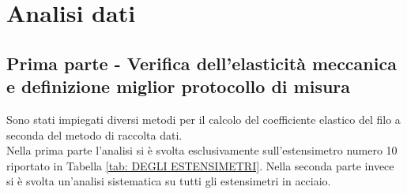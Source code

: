 \documentclass[a4paper,11pt,oneside]{article}
\begin{document}
\section{Analisi dati}

\subsection{Prima parte - Verifica dell'elasticità meccanica e definizione miglior protocollo di misura}
Sono stati impiegati diversi metodi per il calcolo del coefficiente elastico del filo a seconda del metodo di raccolta dati.\\
Nella prima parte l'analisi si è svolta esclusivamente sull'estensimetro numero 10 riportato in Tabella \ref{tab: DEGLI ESTENSIMETRI}. Nella seconda parte invece si è svolta un'analisi sistematica su tutti gli estensimetri in acciaio.
\end{document}
